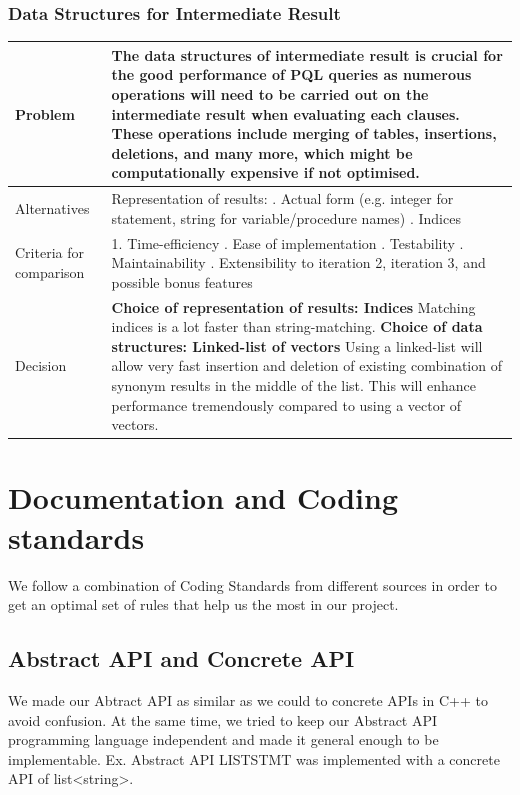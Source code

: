 \documentclass[12pt]{article}
\begin{document}
{{{{{{{{{{\subsubsection{Data Structures for Intermediate Result}
\begin{tabular}{|L{5cm} | L{12cm}| }
\hline
Problem &
The data structures of intermediate result is crucial for the good performance of PQL queries as numerous operations will need to be carried out on the intermediate result when evaluating each clauses. These operations include merging of tables, insertions, deletions, and many more, which might be computationally expensive if not optimised.
 \\
    \hline
    Alternatives & Representation of results: . Actual form (e.g. integer for statement, string for variable/procedure names)
. Indices \\
\hline
    Criteria for comparison &
1. Time-efficiency
. Ease of implementation
. Testability
. Maintainability
. Extensibility to iteration 2, iteration 3, and possible bonus features 
 \\
 \hline
   Decision & \textbf{Choice of representation of results: Indices}
\newline
Matching indices is a lot faster than string-matching.
\newline
\textbf{Choice of data structures: Linked-list of vectors}
\newline
Using a linked-list will allow very fast insertion and deletion of existing combination of synonym results in the middle of the list. This will enhance performance tremendously compared to using a vector of vectors.
 \\
 \hline
\end{tabular}
\section{Documentation and Coding standards}
We follow a combination of Coding Standards from different sources in order to get an optimal set of rules that help us the most in our project.
\subsection{Abstract API and Concrete API}
We made our Abtract API as similar as we could to concrete APIs in C++ to avoid confusion. At the same time, we tried to keep our Abstract API programming language independent and made it general enough to be implementable. Ex. Abstract API LISTSTMT was implemented with a concrete API of list<string>.
}}}}}}}}}}
\end{document}
